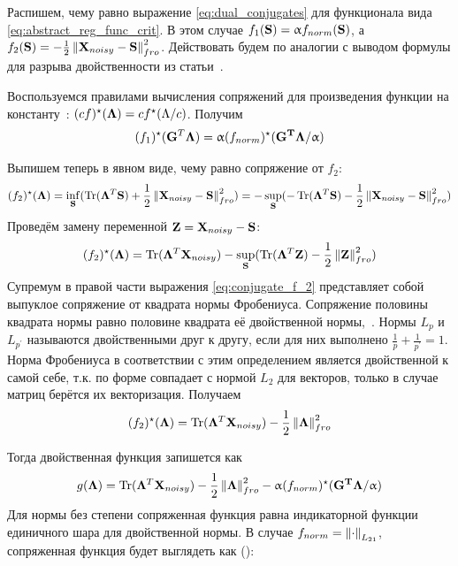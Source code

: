 Распишем, чему равно выражение \ref{eq:dual_conjugates} для функционала вида
\ref{eq:abstract_reg_func_crit}.  В этом случае $f_1(\mathbf{S}) = \upalpha
f_{norm}(\mathbf{S})$, а $f_2(\mathbf{S}) = - \frac{1}{2}\left\lVert\mathbf{X}_{noisy} -
\mathbf{S}\right\rVert_{fro}^2$.  Действовать будем по аналогии с выводом формулы для
разрыва двойственности из статьи~\cite{Gramfort2014}.

Воспользуемся правилами вычисления сопряжений для произведения функции на
константу~\cite{Boyd2004}: $(c f)^{\star}(\mathbf{\Lambda}) = c f^{\star}(\Lambda
/ c)$. Получим
\begin{equation}
    (f_1)^{\star}(\mathbf{G}^T\mathbf{\Lambda}) =
    \upalpha (f_{norm})^{\star}(\mathbf{G^T\Lambda}/\upalpha)
\end{equation}

Выпишем теперь в явном виде, чему равно сопряжение от $f_2$:
\begin{equation*}
    (f_2)^{\star}(\mathbf{\Lambda}) =
    \inf_{\mathbf{S}}(\operatorname*{Tr}(\mathbf{\Lambda}^T\mathbf{S}) + \frac{1}{2}\left\lVert\mathbf{X}_{noisy} - \mathbf{S}\right\rVert_{fro}^2) =
    - \sup_{\mathbf{S}}(- \operatorname*{Tr}(\mathbf{\Lambda}^T\mathbf{S}) - \frac{1}{2}\left\lVert\mathbf{X}_{noisy} - \mathbf{S}\right\rVert_{fro}^2)
\end{equation*}
Проведём замену переменной $\mathbf{Z} = \mathbf{X}_{noisy} - \mathbf{S}$:
\begin{equation}
    (f_2)^{\star}(\mathbf{\Lambda}) =
    \operatorname*{Tr}(\mathbf{\Lambda}^T\mathbf{X}_{noisy}) - \sup_{\mathbf{S}}(\operatorname*{Tr}(\mathbf{\Lambda}^T\mathbf{Z}) - \frac{1}{2}\left\lVert\mathbf{Z}\right\rVert_{fro}^2)
    \label{eq:conjugate_f_2}
\end{equation}
Супремум в правой части выражения \ref{eq:conjugate_f_2} представляет собой выпуклое сопряжение
от квадрата нормы Фробениуса. Сопряжение половины квадрата нормы равно половине квадрата её двойственной нормы,~\cite{Boyd2004, Gramfort2012}.
Нормы $L_p$ и $L_{p^{\prime}}$ называются двойственными друг к другу, если для них выполнено $\frac{1}{p} + \frac{1}{p^{\prime}} = 1$.
Норма Фробениуса в соответствии с этим определением является двойственной к самой себе, т.к. по форме совпадает с нормой $L_2$ для векторов, только в
случае матриц берётся их векторизация. Получаем
\begin{equation}
    (f_2)^{\star}(\mathbf{\Lambda}) =
    \operatorname*{Tr}(\mathbf{\Lambda}^T\mathbf{X}_{noisy}) - \frac{1}{2}\left\lVert\mathbf{\Lambda}\right\rVert^2_{fro}
\end{equation}

Тогда двойственная функция запишется как 
\begin{equation}
    g(\mathbf{\Lambda}) =
    \operatorname*{Tr}(\mathbf{\Lambda}^T\mathbf{X}_{noisy}) - \frac{1}{2}\left\lVert\mathbf{\Lambda}\right\rVert^2_{fro} - \upalpha (f_{norm})^{\star}(\mathbf{G^T\Lambda}/\upalpha)
    \label{eq:dual_func}
\end{equation}
Для нормы без степени сопряженная функция равна индикаторной функции единичного шара для двойственной нормы.
В случае $f_{norm} = \left\lVert\cdot\right\rVert_{L_{21}}$, сопряженная функция будет выглядеть как (\cite{Gramfort2012}):

